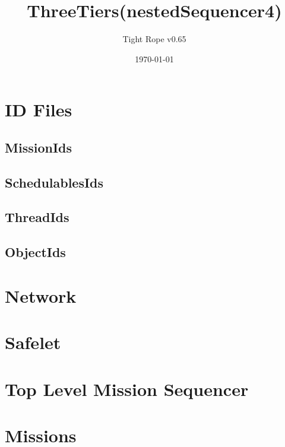 \documentclass[10pt,a4paper]{article}
\title{ThreeTiers(nestedSequencer4)}
\author{Tight Rope v0.65}
\date{\today}
\begin{document}
\maketitle

\section{ID Files}
\subsection{MissionIds}

\newpage

\subsection{SchedulablesIds}

\newpage

\subsection{ThreadIds}

\newpage

\subsection{ObjectIds}

\newpage

\section{Network}

\newpage


\section{Safelet}

\newpage
{}
\newpage

\section{Top Level Mission Sequencer}

\newpage
{}
\newpage

\section{Missions}
\end{document}
